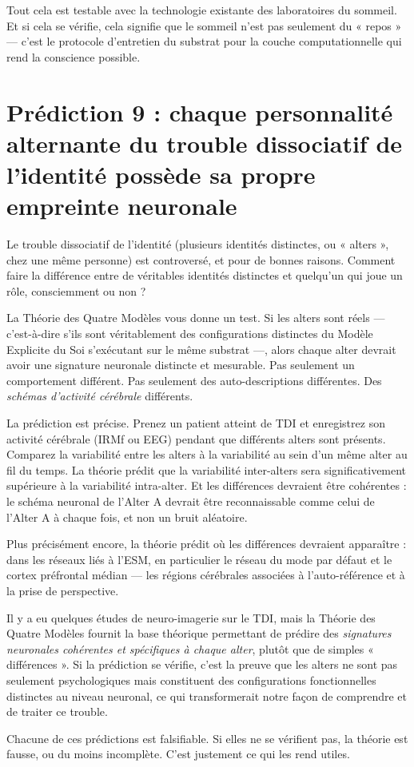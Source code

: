 \documentclass[11pt, twoside, openright]{book}
\begin{document}
Tout cela est testable avec la technologie existante des laboratoires du sommeil. Et si cela se vérifie, cela signifie que le sommeil n'est pas seulement du « repos » --- c'est le protocole d'entretien du substrat pour la couche computationnelle qui rend la conscience possible.

\section*{Prédiction 9 : chaque personnalité alternante du trouble dissociatif de l'identité possède sa propre empreinte neuronale}

Le trouble dissociatif de l'identité (plusieurs identités distinctes, ou « alters », chez une même personne) est controversé, et pour de bonnes raisons. Comment faire la différence entre de véritables identités distinctes et quelqu'un qui joue un rôle, consciemment ou non ?

La Théorie des Quatre Modèles vous donne un test. Si les alters sont réels --- c'est-à-dire s'ils sont véritablement des configurations distinctes du Modèle Explicite du Soi s'exécutant sur le même substrat ---, alors chaque alter devrait avoir une signature neuronale distincte et mesurable. Pas seulement un comportement différent. Pas seulement des auto-descriptions différentes. Des \textit{schémas d'activité cérébrale} différents.

La prédiction est précise. Prenez un patient atteint de TDI et enregistrez son activité cérébrale (IRMf ou EEG) pendant que différents alters sont présents. Comparez la variabilité entre les alters à la variabilité au sein d'un même alter au fil du temps. La théorie prédit que la variabilité inter-alters sera significativement supérieure à la variabilité intra-alter. Et les différences devraient être cohérentes : le schéma neuronal de l'Alter A devrait être reconnaissable comme celui de l'Alter A à chaque fois, et non un bruit aléatoire.

Plus précisément encore, la théorie prédit où les différences devraient apparaître : dans les réseaux liés à l'ESM, en particulier le réseau du mode par défaut et le cortex préfrontal médian --- les régions cérébrales associées à l'auto-référence et à la prise de perspective.

Il y a eu quelques études de neuro-imagerie sur le TDI, mais la Théorie des Quatre Modèles fournit la base théorique permettant de prédire des \textit{signatures neuronales cohérentes et spécifiques à chaque alter}, plutôt que de simples « différences ». Si la prédiction se vérifie, c'est la preuve que les alters ne sont pas seulement psychologiques mais constituent des configurations fonctionnelles distinctes au niveau neuronal, ce qui transformerait notre façon de comprendre et de traiter ce trouble.

Chacune de ces prédictions est falsifiable. Si elles ne se vérifient pas, la théorie est fausse, ou du moins incomplète. C'est justement ce qui les rend utiles.
\end{document}
